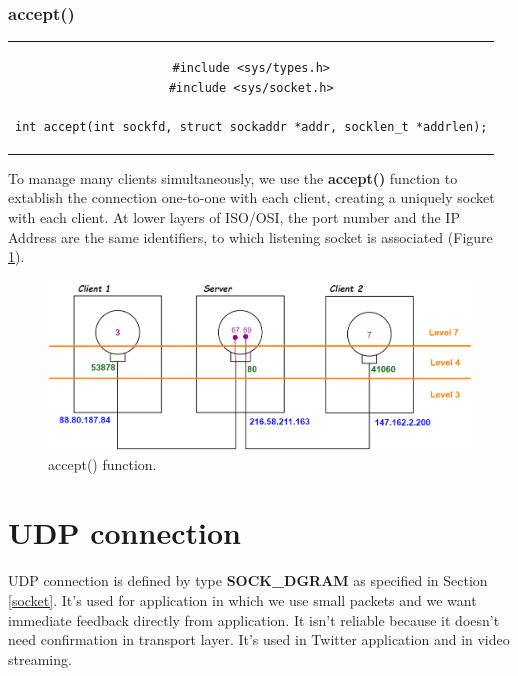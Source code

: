 \subsubsection{accept()}
\begin{center}
\begin{tabular}{c}
\begin{lstlisting}[linewidth=280pt, basicstyle=\footnotesize\sffamily,]
#include <sys/types.h>
#include <sys/socket.h>

int accept(int sockfd, struct sockaddr *addr, socklen_t *addrlen);
\end{lstlisting}
\end{tabular}
\end{center}

To manage many clients simultaneously, we use the \textbf{accept()} function to extablish the connection one-to-one with each client, creating a uniquely socket with each client. At lower layers of ISO/OSI, the port number and the IP Address are the same identifiers, to which listening socket is associated (Figure \ref{accept}).
 
\begin{figure}[h]
\centering
\includegraphics[scale=0.3]{Images/NetworkC/accept}\caption{\footnotesize{accept() function.}}\label{accept}
\end{figure}

\section{UDP connection}
UDP connection is defined by type \textbf{SOCK\_DGRAM} as specified in Section \ref{socket}. It's used for application in which we use small packets and we want immediate feedback directly from application. It isn't reliable because it doesn't need confirmation in transport layer. It's used in Twitter application and in video streaming.